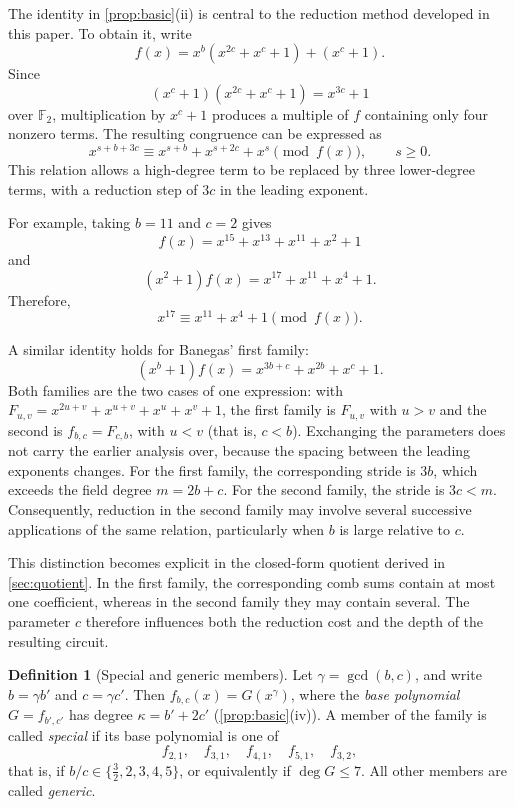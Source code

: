 \documentclass{ieeeaccess}
\theoremstyle{plain}
\theoremstyle{definition}
\newtheorem{definition}[theorem]{Definition}
\newcommand{\F}{\mathbb{F}}
\begin{document}
The identity in \cref{prop:basic}(ii) is central to the reduction method
developed in this paper. To obtain it, write
\[
  f(x)=x^b(x^{2c}+x^c+1)+(x^c+1).
\]
Since
\[
  (x^c+1)(x^{2c}+x^c+1)=x^{3c}+1
\]
over $\F_2$, multiplication by $x^c+1$ produces a multiple of $f$ containing
only four nonzero terms. The resulting congruence can be expressed as
\[
  x^{s+b+3c}\equiv
  x^{s+b}+x^{s+2c}+x^s\pmod{f(x)},
  \qquad s\ge0.
\]
This relation allows a high-degree term to be replaced by three lower-degree
terms, with a reduction step of $3c$ in the leading exponent.

For example, taking $b=11$ and $c=2$ gives
\[
  f(x)=x^{15}+x^{13}+x^{11}+x^2+1
\]
and
\[
  (x^2+1)f(x)=x^{17}+x^{11}+x^4+1.
\]
Therefore,
\[
  x^{17}\equiv x^{11}+x^4+1\pmod{f(x)}.
\]

A similar identity holds for Banegas' first family:
\[
  (x^b+1)f(x)=x^{3b+c}+x^{2b}+x^c+1.
\]
Both families are the two cases of one expression: with
$F_{u,v}=x^{2u+v}+x^{u+v}+x^u+x^v+1$, the first family is $F_{u,v}$ with $u>v$
and the second is $f_{b,c}=F_{c,b}$, with $u<v$ (that is, $c<b$). Exchanging the parameters does
not carry the earlier analysis over, because the spacing between the leading
exponents changes. For the first family, the corresponding stride is $3b$, which exceeds the field degree
$m=2b+c$. For the second family, the stride is $3c<m$. Consequently, reduction
in the second family may involve several successive applications of the same
relation, particularly when $b$ is large relative to $c$.

This distinction becomes explicit in the closed-form quotient derived in
\cref{sec:quotient}. In the first family, the corresponding comb sums contain at
most one coefficient, whereas in the second family they may contain several. The
parameter $c$ therefore influences both the reduction cost and the depth of the
resulting circuit.

\begin{definition}[Special and generic members]
\label{def:special}
Let $\gamma=\gcd(b,c)$, and write $b=\gamma b'$ and $c=\gamma c'$. Then
$f_{b,c}(x)=G(x^\gamma)$, where the \emph{base polynomial} $G=f_{b',c'}$ has
degree $\kappa=b'+2c'$ (\cref{prop:basic}(iv)). A member of the family is called
\emph{special} if its base polynomial is one of
\[
  f_{2,1},\quad f_{3,1},\quad f_{4,1},\quad f_{5,1},\quad f_{3,2},
\]
that is, if $b/c\in\{\tfrac32,2,3,4,5\}$, or equivalently if $\deg G\le7$. All
other members are called \emph{generic}.
\end{definition}
\end{document}
